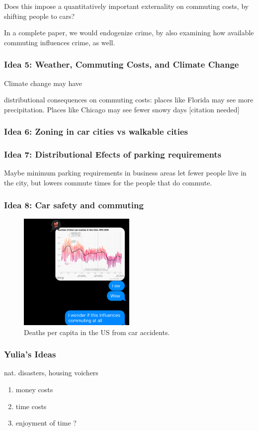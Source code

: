 \documentclass{article}
\begin{document}
Does this impose a quantitatively important externality on commuting costs, by shifting people to cars?

In a complete paper, we would endogenize crime, by also examining how available commuting influences crime, as well. 

\subsubsection{Idea 5: Weather, Commuting Costs, and Climate Change}
Climate change may have 

distributional consequences on commuting costs:
places like Florida may see more precipitation. Places like Chicago may see fewer snowy days [citation needed]
\subsubsection{Idea 6: Zoning in car cities vs walkable cities}

\subsubsection{Idea 7: Distributional Efects of parking requirements}
Maybe minimum parking requirements in business areas let fewer people live in the city, but lowers commute times for the people that do commute.
\subsubsection{Idea 8: Car safety and commuting}
\begin{figure}
    \centering
    \includegraphics[width=0.5\textwidth]{img/cardeaths.jpeg}
    \caption{Deaths per capita in the US from car accidents.}
    \label{fig:car_deaths}
\end{figure}


\subsubsection{Yulia's Ideas}
nat.  disasters, housing voichers
\begin{enumerate}
\item money costs
\item time costs
\item enjoyment of time ? 
\end{enumerate}
\end{document}
